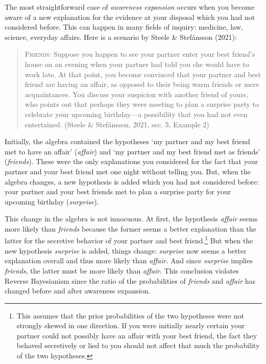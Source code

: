 \documentclass[
  11pt,
  dvipsnames,enabledeprecatedfontcommands]{scrartcl}
\begin{document}
The most straightforward case of \emph{awareness expansion} occurs when
you become aware of a new explanation for the evidence at your disposal
which you had not considered before. This can happen in many fields of
inquiry: medicine, law, science, everyday affairs. Here is a scenario by
Steele \& Stefánsson (2021):

\begin{quote}
\textsc{Friends}: Suppose you happen to see your partner enter your best
friend's house on an evening when your partner had told you she would
have to work late. At that point, you become convinced that your partner
and best friend are having an affair, as opposed to their being warm
friends or mere acquaintances. You discuss your suspicion with another
friend of yours, who points out that perhaps they were meeting to plan a
surprise party to celebrate your upcoming birthday---a possibility that
you had not even entertained. (Steele \& Stefánsson, 2021, sec. 5,
Example 2)
\end{quote}

\doublespace

\noindent Initially, the algebra contained the hypotheses `my partner
and my best friend met to have an affair' (\textit{affair}) and `my
partner and my best friend met as friends' (\textit{friends}). These
were the only explanations you considered for the fact that your partner
and your best friend met one night without telling you. But, when the
algebra changes, a new hypothesis is added which you had not considered
before: your partner and your best friends met to plan a surprise party
for your upcoming birthday (\textit{surprise}).

This change in the algebra is not innocuous. At first, the hypothesis
\textit{affair} seems more likely than \textit{friends} because the
former seems a better explanation than the latter for the secretive
behavior of your partner and best friend.\footnote{This assumes that the
  prior probabilities of the two hypotheses were not strongly skewed in
  one direction. If you were initially nearly certain your partner could
  not possibly have an affair with your best friend, the fact they
  behaved secretively or lied to you should not affect that much the
  probability of the two hypotheses.} But when the new hypothesis
\textit{surprise} is added, things change: \textit{surprise} now seems a
better explanation overall and thus more likely than \textit{affair}.
And since \textit{surprise} implies \textit{friends}, the latter must be
more likely than \textit{affair}. This conclusion violates Reverse
Bayesianism since the ratio of the probabilities of \textit{friends} and
\textit{affair} has changed before and after awareness expansion.
\end{document}
